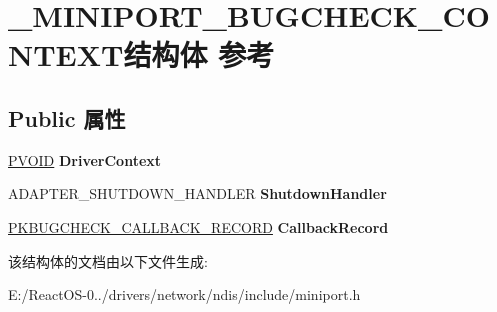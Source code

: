\hypertarget{struct___m_i_n_i_p_o_r_t___b_u_g_c_h_e_c_k___c_o_n_t_e_x_t}{}\section{\+\_\+\+M\+I\+N\+I\+P\+O\+R\+T\+\_\+\+B\+U\+G\+C\+H\+E\+C\+K\+\_\+\+C\+O\+N\+T\+E\+X\+T结构体 参考}
\label{struct___m_i_n_i_p_o_r_t___b_u_g_c_h_e_c_k___c_o_n_t_e_x_t}
\subsection*{Public 属性}
\begin{DoxyCompactItemize}
\item 
\mbox{\label{struct___m_i_n_i_p_o_r_t___b_u_g_c_h_e_c_k___c_o_n_t_e_x_t_a1f2ee0334bbe2030cd154bfbd5f0f713}} 
\hyperlink{interfacevoid}{P\+V\+O\+ID} {\bfseries Driver\+Context}
\item 
\mbox{\label{struct___m_i_n_i_p_o_r_t___b_u_g_c_h_e_c_k___c_o_n_t_e_x_t_a5a0a926abde8821b159070f792a6f9fb}} 
A\+D\+A\+P\+T\+E\+R\+\_\+\+S\+H\+U\+T\+D\+O\+W\+N\+\_\+\+H\+A\+N\+D\+L\+ER {\bfseries Shutdown\+Handler}
\item 
\mbox{\label{struct___m_i_n_i_p_o_r_t___b_u_g_c_h_e_c_k___c_o_n_t_e_x_t_a4d33b45783be0813ba232c63df4dad64}} 
\hyperlink{struct___k_b_u_g_c_h_e_c_k___c_a_l_l_b_a_c_k___r_e_c_o_r_d}{P\+K\+B\+U\+G\+C\+H\+E\+C\+K\+\_\+\+C\+A\+L\+L\+B\+A\+C\+K\+\_\+\+R\+E\+C\+O\+RD} {\bfseries Callback\+Record}
\end{DoxyCompactItemize}


该结构体的文档由以下文件生成\+:\begin{DoxyCompactItemize}
\item 
E\+:/\+React\+O\+S-\/0../drivers/network/ndis/include/miniport.\+h\end{DoxyCompactItemize}
